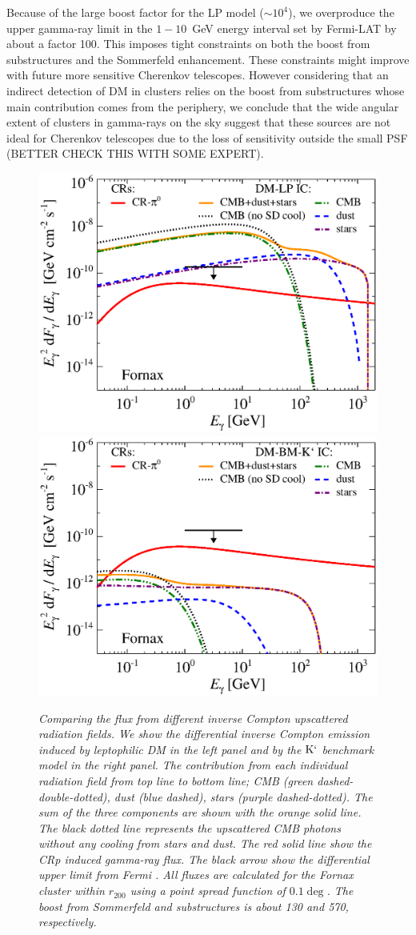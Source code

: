 \documentclass[10pt,aps,pra,reprint,amsmath,amsfonts,amssymb,showpacs]{revtex4-1}
\newcommand{\rmn}{\mathrm}
\newcommand{\Kp}{\rmn{K}`}
\newcommand{\rvir}{r_{200}}
\begin{document}
Because of the large boost factor for the LP model ($\sim 10^4$), we
overproduce the upper gamma-ray limit in the $1-10$~GeV energy
interval set by Fermi-LAT by about a factor 100. This imposes tight
constraints on both the boost from substructures and the Sommerfeld
enhancement. These constraints might improve with future more
sensitive Cherenkov telescopes. However considering that an indirect
detection of DM in clusters relies on the boost from substructures
whose main contribution comes from the periphery, we conclude that the
wide angular extent of clusters in gamma-rays on the sky suggest that
these sources are not ideal for Cherenkov telescopes due to the loss
of sensitivity outside the small PSF (BETTER CHECK THIS WITH SOME
EXPERT).

\begin{figure}
\begin{minipage}{2.0\columnwidth}
\includegraphics[width=0.49\columnwidth]{figures/flux.IRcomp.v9.0.1deg.1.6T.SubMass.elmu.SF300.noMW.woGal.eps}
\includegraphics[width=0.49\columnwidth]{figures/flux.IRcomp.BMv9.0.1deg.SubMass.noMW.woGal.eps}
\caption{\it Comparing the flux from different inverse Compton
  upscattered radiation fields. We show the differential inverse
  Compton emission induced by leptophilic DM in the left panel and by
  the $\Kp$ benchmark model in the right panel. The contribution from
  each individual radiation field from top line to bottom line; CMB
  (green dashed-double-dotted), dust (blue dashed), stars (purple
  dashed-dotted). The sum of the three components are shown with the
  orange solid line. The black dotted line represents the upscattered
  CMB photons without any cooling from stars and dust. The red solid
  line show the CRp induced gamma-ray flux. The black arrow show the
  differential upper limit from Fermi \cite{2010ApJ...717L..71A}. All
  fluxes are calculated for the Fornax cluster within $\rvir$ using a
  point spread function of $0.1\deg$. The boost from Sommerfeld and
  substructures is about 130 and 570, respectively.}
 \label{fig:IR_comp}
\end{minipage}
\end{figure}
\end{document}
